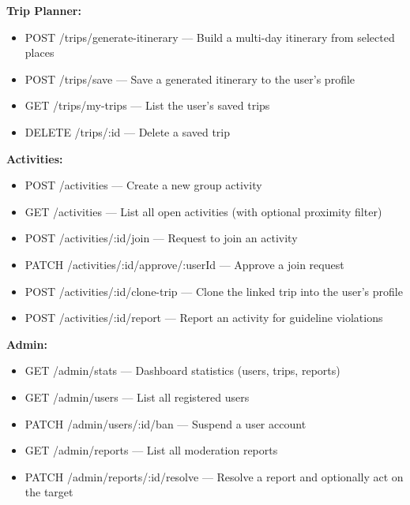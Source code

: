 \documentclass[a4paper,12pt]{report}
\begin{document}
\textbf{Trip Planner:}
\begin{itemize}
    \item POST /trips/generate-itinerary --- Build a multi-day itinerary from selected places
    \item POST /trips/save --- Save a generated itinerary to the user's profile
    \item GET /trips/my-trips --- List the user's saved trips
    \item DELETE /trips/:id --- Delete a saved trip
\end{itemize}

\textbf{Activities:}
\begin{itemize}
    \item POST /activities --- Create a new group activity
    \item GET /activities --- List all open activities (with optional proximity filter)
    \item POST /activities/:id/join --- Request to join an activity
    \item PATCH /activities/:id/approve/:userId --- Approve a join request
    \item POST /activities/:id/clone-trip --- Clone the linked trip into the user's profile
    \item POST /activities/:id/report --- Report an activity for guideline violations
\end{itemize}

\textbf{Admin:}
\begin{itemize}
    \item GET /admin/stats --- Dashboard statistics (users, trips, reports)
    \item GET /admin/users --- List all registered users
    \item PATCH /admin/users/:id/ban --- Suspend a user account
    \item GET /admin/reports --- List all moderation reports
    \item PATCH /admin/reports/:id/resolve --- Resolve a report and optionally act on the target
\end{itemize}
\end{document}
